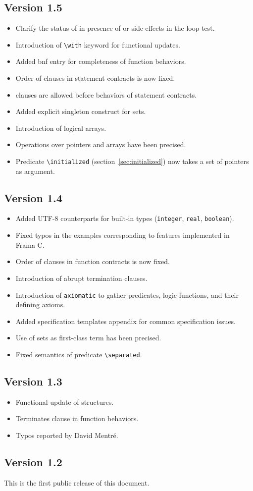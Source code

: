 \subsection{Version 1.5}

\begin{itemize}
\item Clarify the status of \Loop \invariant in presence of
  \Break or side-effects in the loop test.
\item Introduction of \lstinline|\with| keyword for functional updates.
\item Added bnf entry for completeness of function behaviors.
\item Order of clauses in statement contracts is now fixed.
\item \requires clauses are allowed before behaviors of statement contracts.
\item Added explicit singleton construct for sets.
\item Introduction of logical arrays.
\item Operations over pointers and arrays have been precised.
\item Predicate \lstinline|\initialized| (section~\ref{sec:initialized})
  now takes a set of pointers as argument.
\end{itemize}

\subsection{Version 1.4}
\begin{itemize}
\item Added UTF-8 counterparts for built-in types
  (\lstinline|integer|, \lstinline|real|, \lstinline|boolean|).
\item Fixed typos in the examples corresponding to features
  implemented in Frama-C.
\item Order of clauses in function contracts is now fixed.
\item Introduction of abrupt termination clauses.
\item Introduction of \lstinline|axiomatic| to gather predicates, logic
  functions, and their defining axioms.
\item Added specification templates appendix for common specification issues.
\item Use of sets as first-class term has been precised.
\item Fixed semantics of predicate \lstinline|\separated|.
\end{itemize}

\subsection{Version 1.3}
\begin{itemize}
\item Functional update of structures.
\item Terminates clause in function behaviors.
\item Typos reported by David Mentr\'e.
\end{itemize}

\subsection{Version 1.2}
This is the first public release of this document.
